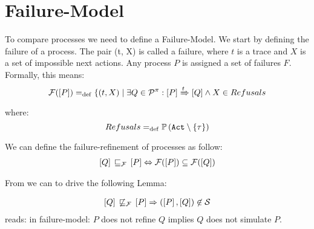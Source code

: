 \section{Failure-Model}
\label{sec_failure-model}
To compare \picalc{} processes we need to define a Failure-Model. We start by defining the failure of a process.
The pair (t, X) is called a failure, where $t$ is a trace and $X$ is a set of impossible next actions. Any process
$P$ is assigned a set of failures $F$. Formally, this means:
\begin{align}
    \failures[P] \define \{(t,X) \mid \exists Q\in\procs: \ec{P} \bigstep{t} \ec{Q}\wedge X\in Refusals\label{failure}
\end{align}
where: \[Refusals \define \pom{\actions\setminus\set{\tau}}\]

We can define the failure-refinement of \picalc{} processes as follow:
\begin{align}
   \ec{Q} \refiF \ec{P} \Leftrightarrow \failures[P]\subseteq\failures[Q]\label{failure-refinement}
\end{align}

From  we can to drive the following Lemma: 

\begin{align}
   \ec{Q} \nrefiF \ec{P} \Rightarrow (\ec{P},\ec{Q})\nin{}\simu\label{failure_model}
\end{align}
 reads: in failure-model: $P$ does not refine $Q$ implies $Q$ does not simulate $P$.